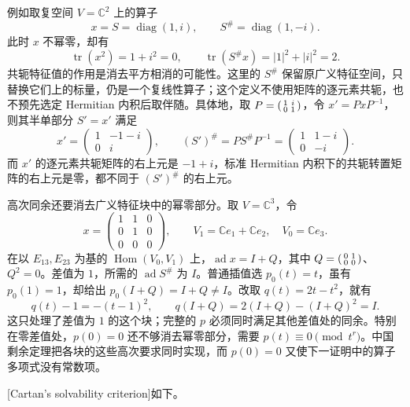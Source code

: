 例如取复空间 \(V=\mathbb C^2\) 上的算子
\[
	x=S=\operatorname{diag}(1,i),\qquad S^\#=\operatorname{diag}(1,-i).
\]
此时 \(x\) 不幂零，却有
\[
	\operatorname{tr}(x^2)=1+i^2=0,\qquad \operatorname{tr}(S^\#x)=|1|^2+|i|^2=2.
\]
共轭特征值的作用是消去平方相消的可能性。这里的 \(S^\#\) 保留原广义特征空间，只替换它们上的标量，仍是一个复线性算子；这个定义不使用矩阵的逐元素共轭，也不预先选定 Hermitian 内积后取伴随。具体地，取 \(P=\begin{psmallmatrix}1&i\\0&1\end{psmallmatrix}\)，令 \(x'=PxP^{-1}\)，则其半单部分 \(S'=x'\) 满足
\[
	x'=\begin{pmatrix}1&-1-i\\0&i\end{pmatrix},\qquad
	(S')^\#=PS^\#P^{-1}
	=\begin{pmatrix}1&1-i\\0&-i\end{pmatrix}.
\]
而 \(x'\) 的逐元素共轭矩阵的右上元是 \(-1+i\)，标准 Hermitian 内积下的共轭转置矩阵的右上元是零，都不同于 \((S')^\#\) 的右上元。

\ProseParagraphBreak

高次同余还要消去广义特征块中的幂零部分。取 \(V=\mathbb C^3\)，令
\[
	x=\begin{pmatrix}1&1&0\\0&1&0\\0&0&0\end{pmatrix},\qquad
	V_1=\mathbb Ce_1+\mathbb Ce_2,\quad V_0=\mathbb Ce_3.
\]
在以 \(E_{13},E_{23}\) 为基的 \(\operatorname{Hom}(V_0,V_1)\) 上，\(\operatorname{ad}x=I+Q\)，其中 \(Q=\begin{psmallmatrix}0&1\\0&0\end{psmallmatrix}\)、\(Q^2=0\)。差值为 \(1\)，所需的 \(\operatorname{ad}S^\#\) 为 \(I\)。普通插值选 \(p_0(t)=t\)，虽有 \(p_0(1)=1\)，却给出 \(p_0(I+Q)=I+Q\ne I\)。改取 \(q(t)=2t-t^2\)，就有
\[
	q(t)-1=-(t-1)^2,\qquad q(I+Q)=2(I+Q)-(I+Q)^2=I.
\]
这只处理了差值为 \(1\) 的这个块；完整的 \(p\) 必须同时满足其他差值处的同余。特别在零差值处，\(p(0)=0\) 还不够消去幂零部分，需要 \(p(t)\equiv0\pmod{t^r}\)。中国剩余定理把各块的这些高次要求同时实现，而 \(p(0)=0\) 又使下一证明中的算子多项式没有常数项。

[Cartan's solvability criterion]如下。

